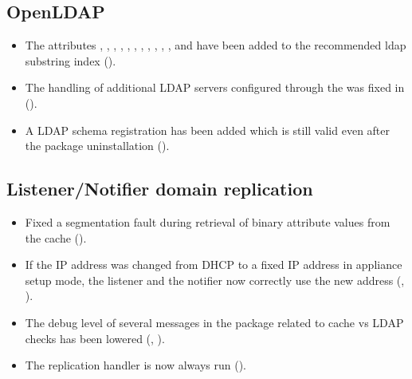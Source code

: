 \subsection{OpenLDAP}

\begin{itemize}

\item The attributes , ,
, , , ,
, ,
,
,
,
 and
 have been added to the
recommended ldap substring index ().

\item The handling of additional LDAP servers configured through the
 was fixed in  
().

\item A LDAP schema registration has been added which is still valid even after
the package uninstallation ().

\end{itemize}



\subsection{Listener/Notifier domain replication}
\begin{itemize}
\item Fixed a segmentation fault during retrieval of binary attribute
  values from the cache ().
\item If the IP address was changed from DHCP to a fixed IP address in
  appliance setup mode, the listener and the notifier now correctly
  use the new address (, ).
\item The debug level of several messages in the
   package related to cache
  vs LDAP checks has been lowered (, ).
\item The replication handler is now always run ().
\end{itemize}

